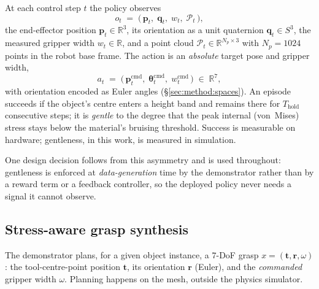 At each control step $t$ the policy observes
\begin{equation}
  o_t \;=\; \bigl(\, \mathbf{p}_t,\; \mathbf{q}_t,\; w_t,\; \mathcal{P}_t \,\bigr),
  \label{eq:obs}
\end{equation}
the end-effector position $\mathbf{p}_t\!\in\!\mathbb{R}^3$, its orientation as a unit
quaternion $\mathbf{q}_t\!\in\!S^3$, the measured gripper width $w_t\!\in\!\mathbb{R}$, and a
point cloud $\mathcal{P}_t\!\in\!\mathbb{R}^{N_p\times 3}$ with $N_p\!=\!1024$ points in the
robot base frame. The action is an \emph{absolute} target pose and gripper width,
\begin{equation}
  a_t \;=\; \bigl(\, \mathbf{p}^{\mathrm{cmd}}_t,\; \boldsymbol{\theta}^{\mathrm{cmd}}_t,\;
                    w^{\mathrm{cmd}}_t \,\bigr) \;\in\; \mathbb{R}^{7},
  \label{eq:act}
\end{equation}
with orientation encoded as Euler angles (\S\ref{sec:method:spaces}). An episode succeeds if
the object's centre enters a height band and remains there for $T_{\text{hold}}$ consecutive
steps; it is \emph{gentle} to the degree that the peak internal (von~Mises) stress stays
below the material's bruising threshold. Success is measurable on hardware; gentleness, in
this work, is measured in simulation.

One design decision follows from this asymmetry and is used throughout: gentleness is
enforced at \emph{data-generation} time by the demonstrator rather than by a reward term or a
feedback controller, so the deployed policy never needs a signal it cannot observe.

\subsection{Stress-aware grasp synthesis}
\label{sec:method:synth}

The demonstrator plans, for a given object instance, a $7$-DoF grasp
$x = (\mathbf{t}, \mathbf{r}, \omega)$: the tool-centre-point position $\mathbf{t}$, its
orientation $\mathbf{r}$ (Euler), and the \emph{commanded} gripper width $\omega$. Planning
happens on the mesh, outside the physics simulator.

